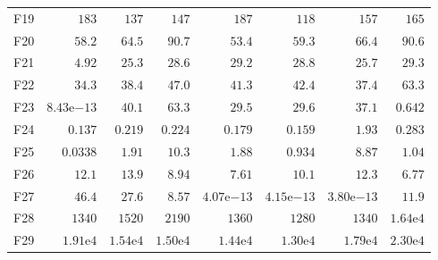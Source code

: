 \begin{tabular}{lrrrrrrr}
F19 & $183$ & $137$ & $147$ & $187$ & $118$ & $157$ & $165$ \\
F20 & $58.2$ & $64.5$ & $90.7$ & $53.4$ & $59.3$ & $66.4$ & $90.6$ \\
F21 & $4.92$ & $25.3$ & $28.6$ & $29.2$ & $28.8$ & $25.7$ & $29.3$ \\
F22 & $34.3$ & $38.4$ & $47.0$ & $41.3$ & $42.4$ & $37.4$ & $63.3$ \\
F23 & $8.43\mathrm{e}{-13}$ & $40.1$ & $63.3$ & $29.5$ & $29.6$ & $37.1$ & $0.642$ \\
F24 & $0.137$ & $0.219$ & $0.224$ & $0.179$ & $0.159$ & $1.93$ & $0.283$ \\
F25 & $0.0338$ & $1.91$ & $10.3$ & $1.88$ & $0.934$ & $8.87$ & $1.04$ \\
F26 & $12.1$ & $13.9$ & $8.94$ & $7.61$ & $10.1$ & $12.3$ & $6.77$ \\
F27 & $46.4$ & $27.6$ & $8.57$ & $4.07\mathrm{e}{-13}$ & $4.15\mathrm{e}{-13}$ & $3.80\mathrm{e}{-13}$ & $11.9$ \\
F28 & $1340$ & $1520$ & $2190$ & $1360$ & $1280$ & $1340$ & $1.64\mathrm{e}{4}$ \\
F29 & $1.91\mathrm{e}{4}$ & $1.54\mathrm{e}{4}$ & $1.50\mathrm{e}{4}$ & $1.44\mathrm{e}{4}$ & $1.30\mathrm{e}{4}$ & $1.79\mathrm{e}{4}$ & $2.30\mathrm{e}{4}$ \\
\bottomrule
\end{tabular}
